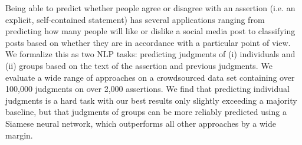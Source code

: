 Being able to predict whether people agree or disagree with an assertion (i.e. an explicit, self-contained statement) has several applications ranging from predicting how many people will like or dislike a social media post to classifying posts based on whether they are in accordance with a particular point of view. We formalize this as two NLP tasks: predicting judgments of (i) individuals and (ii) groups based on the text of the assertion and previous judgments. We evaluate a wide range of approaches on a crowdsourced data set containing over 100,000 judgments on over 2,000 assertions. We find that predicting individual judgments is a hard task with our best results only slightly exceeding a majority baseline, but that judgments of groups can be more reliably predicted using a Siamese neural network, which outperforms all other approaches by a wide margin.

